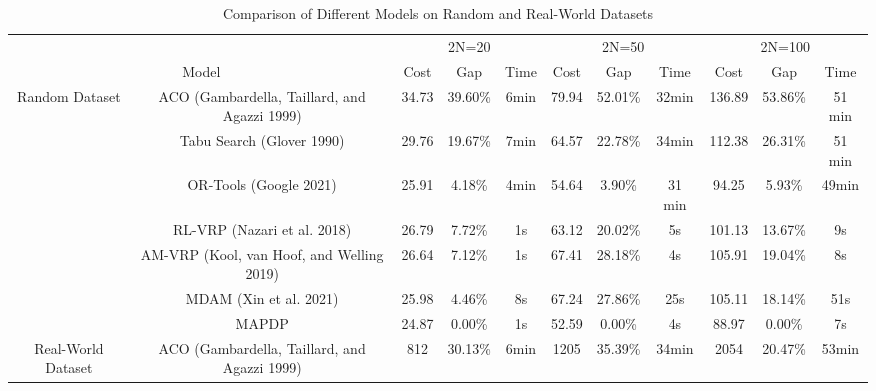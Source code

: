 \documentclass{article}
\begin{document}
\begin{table}
    \centering
    \caption{Comparison of Different Models on Random and Real-World Datasets}
    \label{table:comparison-models}
    \begin{tabular}{cc|ccc|ccc|ccc}
        \multicolumn{2}{c}{}      & \multicolumn{3}{c}{2N=20}                    & \multicolumn{3}{c}{2N=50} & \multicolumn{3}{c}{2N=100}                                                               \\
        \cline{3-11}
        \multicolumn{2}{c}{Model} & Cost                                         & Gap                       & Time                       & Cost & Gap   & Time    & Cost   & Gap    & Time             \\
        \hline
        \multirow{3}{*}{Random Dataset}
                                  & ACO (Gambardella, Taillard, and Agazzi 1999) & 34.73                     & 39.60\%                    & 6min & 79.94 & 52.01\% & 32min  & 136.89 & 53.86\% & 51 min \\
                                  & Tabu Search (Glover 1990)                    & 29.76                     & 19.67\%                    & 7min & 64.57 & 22.78\% & 34min  & 112.38 & 26.31\% & 51 min \\
                                  & OR-Tools (Google 2021)                       & 25.91                     & 4.18\%                     & 4min & 54.64 & 3.90\%  & 31 min & 94.25  & 5.93\%  & 49min  \\
                                  & RL-VRP (Nazari et al. 2018)                  & 26.79                     & 7.72\%                     & 1s   & 63.12 & 20.02\% & 5s     & 101.13 & 13.67\% & 9s     \\
                                  & AM-VRP (Kool, van Hoof, and Welling 2019)    & 26.64                     & 7.12\%                     & 1s   & 67.41 & 28.18\% & 4s     & 105.91 & 19.04\% & 8s     \\
                                  & MDAM (Xin et al. 2021)                       & 25.98                     & 4.46\%                     & 8s   & 67.24 & 27.86\% & 25s    & 105.11 & 18.14\% & 51s    \\
                                  & MAPDP                                        & 24.87                     & 0.00\%                     & 1s   & 52.59 & 0.00\%  & 4s     & 88.97  & 0.00\%  & 7s     \\
        \hline
        \multirow{5}{*}{Real-World Dataset}
                                  & ACO (Gambardella, Taillard, and Agazzi 1999) & 812                       & 30.13\%                    & 6min & 1205  & 35.39\% & 34min  & 2054   & 20.47\% & 53min  \\

\end{tabular}
\end{table}
\end{document}
